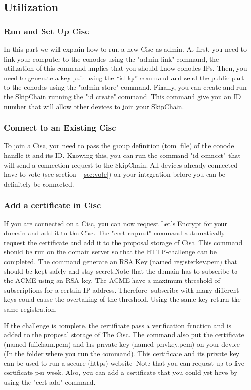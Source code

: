\documentclass[11pt, a4paper, twoside, openright]{article}
\begin{document}
\subsection{Utilization}
\subsubsection{Run and Set Up Cisc}
In this part we will explain how to run a new Cisc as admin. At first, you need to link your computer to the conodes using the "admin link" command, the utilization of this command implies that you should know conodes IPs. Then, you need to generate a key pair using the “id kp” command and send the public part to the conodes using the "admin store" command. Finally, you can create and run the SkipChain running the "id create" command. This command give you an ID number that will allow other devices to join your SkipChain.
\subsubsection{Connect to an Existing Cisc}
To join a Cisc, you need to pass the group definition (toml file) of the conode handle it and its ID. Knowing this, you can run the command "id connect" that will send a connection request to the SkipChain. All devices already connected have to vote (see section ~\ref{sec:vote}) on your integration before you can be definitely be connected.
\subsubsection{Add a certificate in Cisc}  If you are connected on a Cisc, you can now request Let's Encrypt for your domain and add it to the Cisc. The "cert request" command automatically request the certificate and add it to the proposal storage of Cisc. This command should be run on the domain server so that the HTTP-challenge can be completed. 
The command generate an RSA Key (named registerkey.pem) that should be kept safely and stay secret.Note that the domain has to subscribe to the ACME using an RSA key. The ACME have a maximum threshold of subscriptions for a certain IP address. Therefore, subscribe with many different keys could cause the overtaking of the threshold. Using the same key return the same registration. 

If the challenge is complete, the certificate pass a verification function and is added to the proposal storage of The Cisc. The command also put the certificate (named fullchain.pem) and his private key (named privkey.pem) on your device (In the folder where you run the command). This certificate and its private key can be used to run a secure (https) website.
Note that you can request up to five certificate per week. 
Also, you can add a certificate that you could yet have by using the "cert add" command. 
\end{document}
